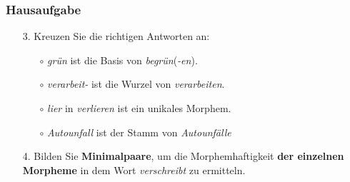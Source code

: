 \begin{frame}
\frametitle{Hausaufgabe}

\begin{enumerate}
	\item[3.] Kreuzen Sie die richtigen Antworten an:

	\begin{itemize}
		\item[$\circ$] \emph{grün} ist die Basis von \emph{begrün}(\emph{-en}). %
		
		\item[$\circ$] \emph{verarbeit-} ist die Wurzel von \emph{verarbeiten}. %
		
		\item[$\circ$] \emph{lier} in \emph{verlieren} ist ein unikales Morphem. %
		
		\item[$\circ$] \emph{Autounfall} ist der Stamm von \emph{Autounfälle} %
	\end{itemize}	
	

	\item[4.] Bilden Sie \textbf{Minimalpaare}, um die Morphemhaftigkeit \textbf{der einzelnen Morpheme} in dem Wort \emph{verschreibt} zu ermitteln.


\end{enumerate}

\end{frame}


